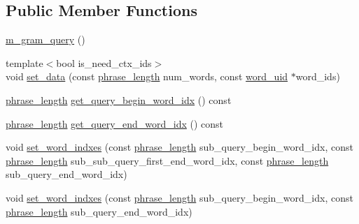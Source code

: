 \subsection*{Public Member Functions}
\begin{DoxyCompactItemize}
\item 
\hyperlink{classuva_1_1smt_1_1bpbd_1_1server_1_1lm_1_1m__gram__query_aa84115dcad6b3e160e13155218793204}{m\+\_\+gram\+\_\+query} ()
\item 
{\footnotesize template$<$bool is\+\_\+need\+\_\+ctx\+\_\+ids$>$ }\\void \hyperlink{classuva_1_1smt_1_1bpbd_1_1server_1_1lm_1_1m__gram__query_a4aa82d43c76e5d73d55bd6802bb039cd}{set\+\_\+data} (const \hyperlink{namespaceuva_1_1smt_1_1bpbd_1_1server_af068a19c2e03116caf3e3827a3e40e35}{phrase\+\_\+length} num\+\_\+words, const \hyperlink{namespaceuva_1_1smt_1_1bpbd_1_1server_a6bfe45ba344d65a7fdd7d26156328ddc}{word\+\_\+uid} $\ast$word\+\_\+ids)
\item 
\hyperlink{namespaceuva_1_1smt_1_1bpbd_1_1server_af068a19c2e03116caf3e3827a3e40e35}{phrase\+\_\+length} \hyperlink{classuva_1_1smt_1_1bpbd_1_1server_1_1lm_1_1m__gram__query_a745114a4083a5e6edc0f0907e4a5a52d}{get\+\_\+query\+\_\+begin\+\_\+word\+\_\+idx} () const 
\item 
\hyperlink{namespaceuva_1_1smt_1_1bpbd_1_1server_af068a19c2e03116caf3e3827a3e40e35}{phrase\+\_\+length} \hyperlink{classuva_1_1smt_1_1bpbd_1_1server_1_1lm_1_1m__gram__query_abdb78520bbb6c44ef6833f93fbdfa657}{get\+\_\+query\+\_\+end\+\_\+word\+\_\+idx} () const 
\item 
void \hyperlink{classuva_1_1smt_1_1bpbd_1_1server_1_1lm_1_1m__gram__query_aea7c89ac3c1b2b7cedd44baae5837061}{set\+\_\+word\+\_\+indxes} (const \hyperlink{namespaceuva_1_1smt_1_1bpbd_1_1server_af068a19c2e03116caf3e3827a3e40e35}{phrase\+\_\+length} sub\+\_\+query\+\_\+begin\+\_\+word\+\_\+idx, const \hyperlink{namespaceuva_1_1smt_1_1bpbd_1_1server_af068a19c2e03116caf3e3827a3e40e35}{phrase\+\_\+length} sub\+\_\+sub\+\_\+query\+\_\+first\+\_\+end\+\_\+word\+\_\+idx, const \hyperlink{namespaceuva_1_1smt_1_1bpbd_1_1server_af068a19c2e03116caf3e3827a3e40e35}{phrase\+\_\+length} sub\+\_\+query\+\_\+end\+\_\+word\+\_\+idx)
\item 
void \hyperlink{classuva_1_1smt_1_1bpbd_1_1server_1_1lm_1_1m__gram__query_a13cf628dca58a65dba402a5dd9d4d50f}{set\+\_\+word\+\_\+indxes} (const \hyperlink{namespaceuva_1_1smt_1_1bpbd_1_1server_af068a19c2e03116caf3e3827a3e40e35}{phrase\+\_\+length} sub\+\_\+query\+\_\+begin\+\_\+word\+\_\+idx, const \hyperlink{namespaceuva_1_1smt_1_1bpbd_1_1server_af068a19c2e03116caf3e3827a3e40e35}{phrase\+\_\+length} sub\+\_\+query\+\_\+end\+\_\+word\+\_\+idx)

\end{DoxyCompactItemize}
